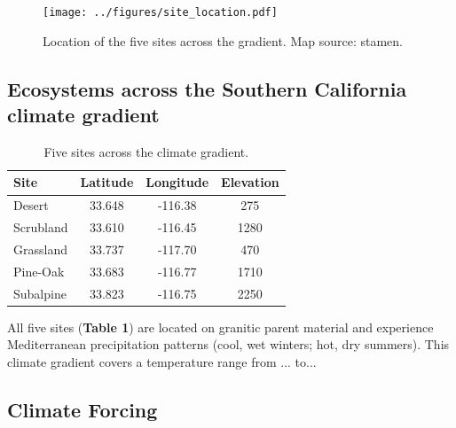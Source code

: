 \documentclass[letterpaper, 10pt]{article}
\begin{document}
\begin{figure}[h]
\centering
      \texttt{[image: ../figures/site\_location.pdf]}
      \caption{Location of the five sites across the gradient. Map source: stamen.}
      \label{fig: figure 1}
\end{figure}

\subsection{\large Ecosystems across the Southern California climate gradient}

\begin{table}[h!]
  \begin{center}
    \caption{Five sites across the climate gradient.}
    \label{tab: table1}
    \begin{tabular}{lccc}
      \toprule %
      \textbf{Site} & \textbf{Latitude} & \textbf{Longitude} & \textbf{Elevation}\\
      \midrule %
      Desert       & 33.648 & -116.38 & 275\\
      Scrubland & 33.610 & -116.45 & 1280\\
      Grassland & 33.737 & -117.70 & 470\\
      Pine-Oak  & 33.683 & -116.77  & 1710\\
      Subalpine & 33.823 & -116.75  & 2250\\
      \bottomrule %
    \end{tabular}
  \end{center}
\end{table}

All five sites (\textbf{Table 1}) are located on granitic parent material and experience Mediterranean precipitation patterns (cool, wet winters; hot, dry summers). This climate gradient covers a temperature range from ... to...



\subsection{\large Climate Forcing}
\end{document}
